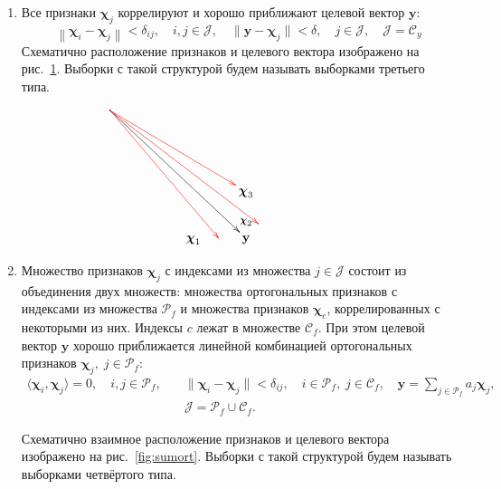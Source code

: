 \documentclass[a4paper,12pt]{article}
\newcommand{\by}{\mathbf{y}}
\newcommand{\bchi}{\boldsymbol{\chi}}
\newcommand{\calC}{\mathcal{C}}
\newcommand{\calP}{\mathcal{P}}
\newcommand{\calJ}{\mathcal{J}}
\begin{document}
\begin{enumerate}
\item Все признаки $\bchi_j$ коррелируют и хорошо приближают целевой вектор $\by$:
\begin{equation}
\left \| \bchi_i - \bchi_j \right \| < \delta_{ij}, \quad i, j \in \calJ, \quad \| \by - \bchi_j \| < \delta, \quad j \in \calJ, \quad \calJ = \calC_y 
\label{eq:col}
\end{equation}
Схематично расположение признаков и целевого вектора изображено на рис.~\ref{fig:col}. Выборки с такой структурой будем называть выборками третьего типа.  

\begin{figure}[!h]
\begin{equation*}
\xymatrix{
*=0{.}\ar[rrrddd]^>>{\large \bchi_2} %
\ar@[red][rrrdd] %
\ar@[red][dddrr]+/va(0) 20pt/ %
\ar@[red][rrrddd]+/va(50) 15pt/& & & \\
& & & & & & \\
& & & \bchi_3  \\
& & \bchi_1 &  \by 
}
\end{equation*}
\caption{}
\label{fig:col}
\end{figure}

\item Множество признаков $\bchi_j$ с индексами из множества $j \in \calJ$ состоит из объединения двух множеств: множества ортогональных признаков с индексами из множества $\calP_f$ и множества признаков $\bchi_c$, коррелированных с некоторыми из них. Индексы $c$ лежат в множестве $\calC_f$. При этом целевой вектор $\by$ хорошо приближается линейной комбинацией ортогональных признаков $\bchi_j, \; j \in \calP_f$:
\begin{equation}
\begin{split}
\langle \bchi_i, \bchi_j \rangle = 0, \quad i, j \in \calP_f, \quad & \| \bchi_i - \bchi_j \| < \delta_{ij}, \quad i \in \calP_f, \; j \in \calC_f, \quad \by = \sum\limits_{j \in \calP_f} a_j\bchi_j, \\ 
& \calJ = \calP_f \cup \calC_f.
\end{split}
\label{eq:sumort}
\end{equation}

Схематично взаимное расположение признаков и целевого вектора изображено на рис.~\ref{fig:sumort}. Выборки с такой структурой будем называть выборками четвёртого типа.  


\end{enumerate}
\end{document}
